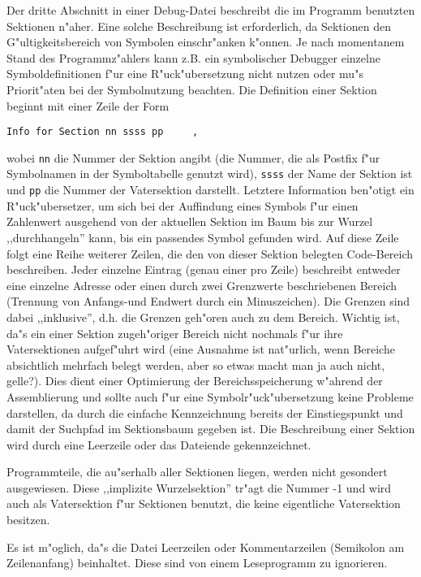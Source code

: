 \documentclass[12pt,a4paper,twoside]{report}
\newcommand{\tty}[1]{{\tt #1}}
\begin{document}
{Der dritte Abschnitt in einer Debug-Datei beschreibt die im Programm
benutzten Sektionen n"aher.  Eine solche Beschreibung ist erforderlich,
da Sektionen den G"ultigkeitsbereich von Symbolen einschr"anken
k"onnen.  Je nach momentanem Stand des Programmz"ahlers kann z.B. ein
symbolischer Debugger einzelne Symboldefinitionen f"ur eine R"uck"ubersetzung
nicht nutzen oder mu"s Priorit"aten bei der Symbolnutzung beachten.
Die Definition einer Sektion beginnt mit einer Zeile der Form
\begin{verbatim}
Info for Section nn ssss pp     ,
\end{verbatim}
wobei \tty{nn} die Nummer der Sektion angibt (die Nummer, die als Postfix
f"ur Symbolnamen in der Symboltabelle genutzt wird), \tty{ssss} der Name der
Sektion ist und \tty{pp} die Nummer der Vatersektion darstellt.  Letztere
Information ben"otigt ein R"uck"ubersetzer, um sich bei der Auffindung
eines Symbols f"ur einen Zahlenwert ausgehend von der aktuellen Sektion
im Baum bis zur Wurzel ,,durchhangeln'' kann, bis ein passendes
Symbol gefunden wird.  Auf diese Zeile folgt eine Reihe weiterer
Zeilen, die den von dieser Sektion belegten Code-Bereich beschreiben. 
Jeder einzelne Eintrag (genau einer pro Zeile) beschreibt entweder
eine einzelne Adresse oder einen durch zwei Grenzwerte beschriebenen
Bereich (Trennung von Anfangs-und Endwert durch ein Minuszeichen). 
Die Grenzen sind dabei ,,inklusive'', d.h. die Grenzen geh"oren auch zu
dem Bereich.  Wichtig ist, da"s ein einer Sektion zugeh"origer Bereich
nicht nochmals f"ur ihre Vatersektionen aufgef"uhrt wird (eine Ausnahme
ist nat"urlich, wenn Bereiche absichtlich mehrfach belegt werden, aber
so etwas macht man ja auch nicht, gelle?).  Dies dient einer Optimierung
der Bereichsspeicherung w"ahrend der Assemblierung und sollte auch
f"ur eine Symbolr"uck"ubersetzung keine Probleme darstellen, da durch
die einfache Kennzeichnung bereits der Einstiegspunkt und damit der
Suchpfad im Sektionsbaum gegeben ist.  Die Beschreibung einer Sektion
wird durch eine Leerzeile oder das Dateiende gekennzeichnet.

Programmteile, die au"serhalb aller Sektionen liegen, werden nicht
gesondert ausgewiesen.  Diese ,,implizite Wurzelsektion'' tr"agt die
Nummer -1 und wird auch als Vatersektion f"ur Sektionen benutzt, die
keine eigentliche Vatersektion besitzen.

Es ist m"oglich, da"s die Datei Leerzeilen oder Kommentarzeilen
(Semikolon am Zeilenanfang) beinhaltet.  Diese sind von einem
Leseprogramm zu ignorieren.

}
\end{document}
